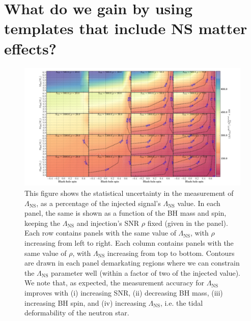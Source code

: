 \documentclass[aps,prd,amsmath,floats,floatfix, twocolumn,
superscriptaddress,nofootinbib,showpacs]{revtex4-1}
\newcommand{\lambdans}{\Lambda_\mathrm{NS}}
\begin{document}
\section{What do we gain by using templates that include NS matter effects?}\label{s1:PEwithNS}
% 
\begin{figure}
\centering    
\includegraphics[trim={3cm 0 0 0},width=2.3\columnwidth]{plots/TTLambdaCIWidths90_0_Lambda_SNR.pdf}
\caption{This figure shows the statistical uncertainty in the measurement of
$\lambdans$, as a percentage of the injected signal's $\lambdans$ value. In each panel,
the same is shown as a function of the BH mass and spin, keeping the 
$\lambdans$ and injection's SNR $\rho$ fixed (given in the panel). Each row contains
panels with the same value of $\lambdans$, with $\rho$ increasing from left to right.
Each column contains panels with the same value of $\rho$, with $\lambdans$ 
increasing from top to bottom.
% 
Contours are drawn in each panel demarkating regions where we can constrain the
$\lambdans$ parameter well (within a factor of two of the injected value).
% 
We note that, as expected, the measurement accuracy for $\lambdans$ improves with (i) increasing
SNR, (ii) decreasing BH mass, (iii) increasing BH spin, and 
(iv) increasing $\lambdans$, i.e. the tidal deformability of the neutron star.
}
\label{fig:TT_LambdaCIWidths90_0_Lambda_SNR}
\end{figure}
% 
\end{document}
